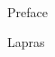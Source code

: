 
\renewcommand{\baselinestretch}{2}
\small\normalsize
\hbox{\ }
 
\vspace{-.65in}

\begin{center}
\large{Preface} 
\end{center} 


Lapras
